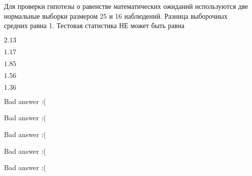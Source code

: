
\begin{question}
Для проверки гипотезы о равенстве математических ожиданий используются
две нормальные выборки размером 25 и 16 наблюдений. Разница выборочных
средних равна 1. Тестовая статистика НЕ может быть равна
\begin{answerlist}
  \item \(2.13\)
  \item \(1.17\)
  \item \(1.85\)
  \item \(1.56\)
  \item \(1.36\)
\end{answerlist}
\end{question}

\begin{solution}
\begin{answerlist}
  \item Bad answer :(
  \item Bad answer :(
  \item Bad answer :(
  \item Bad answer :(
  \item Bad answer :(
\end{answerlist}
\end{solution}

